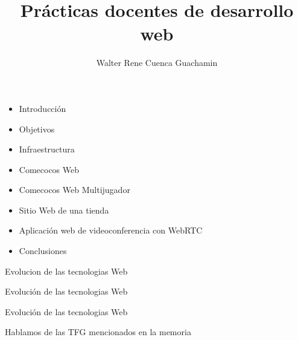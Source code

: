 \documentclass[notes,slidesec,a4]{seminar}
\title{Prácticas docentes de desarrollo web}
\author{Walter Rene Cuenca Guachamin}
\newcommand{\moviewithpreview}[3]{%
\pdfmark[{\texttt{[image: \#2]}}]{%
pdfmark=/ANN,Subtype=/Movie,Movie=<< /F (#3) >>,%
Activation=<< /ShowControls true /Mode /Repeat >>}}
\begin{document}
\maketitle


\begin{hslide}
\begin{itemize}
\item Introducción 
\item Objetivos
\item Infraestructura
\item Comecocos Web
\item Comecocos Web Multijugador
\item Sitio Web de una tienda
\item Aplicación web de videoconferencia con WebRTC
\item Conclusiones
\end{itemize}
\end{hslide}

\begin{hslide}
Evolucion de las tecnologias Web 
\end{hslide}

\begin{hslide}
Evolución de las tecnologias Web 
\end{hslide}


\begin{hslide}
Evolución de las tecnologias Web 
\end{hslide}

\begin{hslide}
Hablamos de las TFG mencionados en la memoria
\end{hslide}
\end{document}
